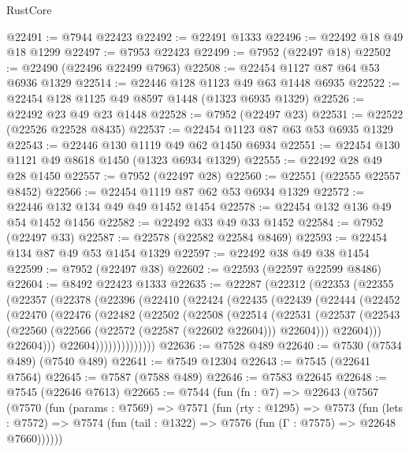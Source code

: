 \begin{lexlean}{RustCore}
\begin{coremodule}
@22491 := @7944 @22423
@22492 := @22491 @1333
@22496 := @22492 @18 @49 @18 @1299
@22497 := @7953 @22423
@22499 := @7952 (@22497 @18)
@22502 := @22490 (@22496 @22499 @7963)
@22508 := @22454 @1127 @87 @64 @53 @6936 @1329
@22514 := @22446 @128 @1123 @49 @63 @1448 @6935
@22522 := @22454 @128 @1125 @49 @8597 @1448 (@1323 @6935 @1329)
@22526 := @22492 @23 @49 @23 @1448
@22528 := @7952 (@22497 @23)
@22531 := @22522 (@22526 @22528 @8435)
@22537 := @22454 @1123 @87 @63 @53 @6935 @1329
@22543 := @22446 @130 @1119 @49 @62 @1450 @6934
@22551 := @22454 @130 @1121 @49 @8618 @1450 (@1323 @6934 @1329)
@22555 := @22492 @28 @49 @28 @1450
@22557 := @7952 (@22497 @28)
@22560 := @22551 (@22555 @22557 @8452)
@22566 := @22454 @1119 @87 @62 @53 @6934 @1329
@22572 := @22446 @132 @134 @49 @49 @1452 @1454
@22578 := @22454 @132 @136 @49 @54 @1452 @1456
@22582 := @22492 @33 @49 @33 @1452
@22584 := @7952 (@22497 @33)
@22587 := @22578 (@22582 @22584 @8469)
@22593 := @22454 @134 @87 @49 @53 @1454 @1329
@22597 := @22492 @38 @49 @38 @1454
@22599 := @7952 (@22497 @38)
@22602 := @22593 (@22597 @22599 @8486)
@22604 := @8492 @22423 @1333
@22635 := @22287
    (@22312
      (@22353
        (@22355
          (@22357
            (@22378
              (@22396
                (@22410
                  (@22424
                    (@22435
                      (@22439
                        (@22444
                          (@22452
                            (@22470
                              (@22476
                                (@22482
                                  (@22502
                                    (@22508
                                      (@22514
                                        (@22531
                                          (@22537
                                            (@22543
                                              (@22560
                                                (@22566 (@22572 (@22587 (@22602 @22604))) @22604)))
                                            @22604)))
                                      @22604)))
                                @22604))))))))))))))
@22636 := @7528 @489
@22640 := @7530 (@7534 @489) (@7540 @489)
@22641 := @7549 @12304
@22643 := @7545 (@22641 @7564)
@22645 := @7587 (@7588 @489)
@22646 := @7583 @22645
@22648 := @7545 (@22646 @7613)
@22665 := @7544
    (fun (fn : @7) =>
    @22643
      (@7567
        (@7570
          (fun (params : @7569) =>
          @7571
            (fun (rty : @1295) =>
            @7573
              (fun (lets : @7572) =>
              @7574 (fun (tail : @1322) => @7576 (fun (Γ : @7575) => @22648 @7660))))))

\end{coremodule}
\end{lexlean}
